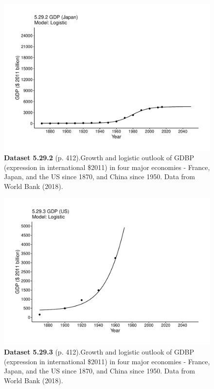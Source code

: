 \documentclass[aps,rmp,preprint,superscriptaddress,10pt,onecolumn]{article}
\begin{document}
\clearpage
\begin{figure}[h]
\includegraphics[width=\textwidth]{output/figs-ggplot/5.29.2.pdf}
\caption*{\textbf{Dataset 5.29.2} (p. 412).Growth and logistic outlook of GDBP (expression in international \$2011) in four major economies - France, Japan, and the US since 1870, and China since 1950. Data from World Bank (2018).}
\end{figure}
	
\clearpage
\begin{figure}[h]
\includegraphics[width=\textwidth]{output/figs-ggplot/5.29.3.pdf}
\caption*{\textbf{Dataset 5.29.3} (p. 412).Growth and logistic outlook of GDBP (expression in international \$2011) in four major economies - France, Japan, and the US since 1870, and China since 1950. Data from World Bank (2018).}
\end{figure}
	
\end{document}
